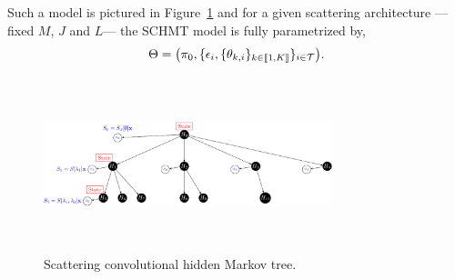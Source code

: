 \documentclass{article}
\begin{document}

    Such a model is pictured in Figure~\ref{fig:SCHMT 1} and for a given scattering architecture ---\ie fixed $M$, $J$ and $L$--- the SCHMT model is fully parametrized by,
    \vspace{-5pt}
    \begin{equation}
      \Theta = \big(\pi_{0}, \{ \epsilon_{i}, \{ \theta_{k,i} \}_{k\in\llbracket1,K\rrbracket} \}_{i\in\mathcal{T}}\big).
      \label{eq:SCHMT - parameters}
    \end{equation}
    \vspace{-15pt}

    \begin{figure}
      \begin{center}
        \includegraphics[width=3.3in, height=2in, keepaspectratio]{scat_HMT_crop.pdf}
        \caption{Scattering convolutional hidden Markov tree.}
        \label{fig:SCHMT 1}
      \end{center}
      \vspace{-15pt}
    \end{figure}
    
\end{document}
